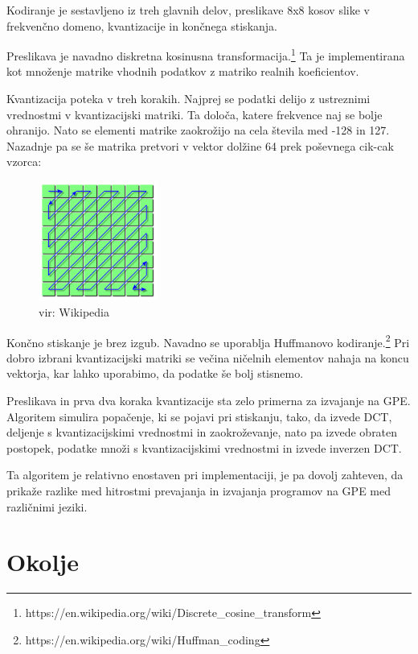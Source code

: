 \documentclass[journal,a4paper,twoside]{sty/IEEEtran}
\begin{document}
Kodiranje je sestavljeno iz treh glavnih delov, preslikave 8x8 kosov slike v frekvenčno domeno, kvantizacije in končnega stiskanja.

Preslikava je navadno diskretna kosinusna transformacija.\footnote{https://en.wikipedia.org/wiki/Discrete\_cosine\_transform}
Ta je implementirana kot množenje matrike vhodnih podatkov z matriko realnih koeficientov.

Kvantizacija poteka v treh korakih.
Najprej se podatki delijo z ustreznimi vrednostmi v kvantizacijski matriki.
Ta določa, katere frekvence naj se bolje ohranijo.
Nato se elementi matrike zaokrožijo na cela števila med -128 in 127.
Nazadnje pa se še matrika pretvori v vektor dolžine 64 prek poševnega cik-cak vzorca:

\begin{figure}[h]
\centering
\includegraphics[width=0.35\textwidth]{jpeg_zigzag}
\caption{vir: Wikipedia}
\end{figure}

Končno stiskanje je brez izgub.
Navadno se uporablja Huffmanovo kodiranje.\footnote{https://en.wikipedia.org/wiki/Huffman\_coding}
Pri dobro izbrani kvantizacijski matriki se večina ničelnih elementov nahaja na koncu vektorja, kar lahko uporabimo, da podatke še bolj stisnemo.

Preslikava in prva dva koraka kvantizacije sta zelo primerna za izvajanje na GPE.
Algoritem simulira popačenje, ki se pojavi pri stiskanju, tako, da izvede DCT, deljenje s kvantizacijskimi vrednostmi in zaokroževanje, nato pa izvede
	obraten postopek, podatke množi s kvantizacijskimi vrednostmi in izvede inverzen DCT.

Ta algoritem je relativno enostaven pri implementaciji, je pa dovolj zahteven, da prikaže razlike med hitrostmi prevajanja in izvajanja programov na GPE
	med različnimi jeziki.

\section{Okolje}
\end{document}
